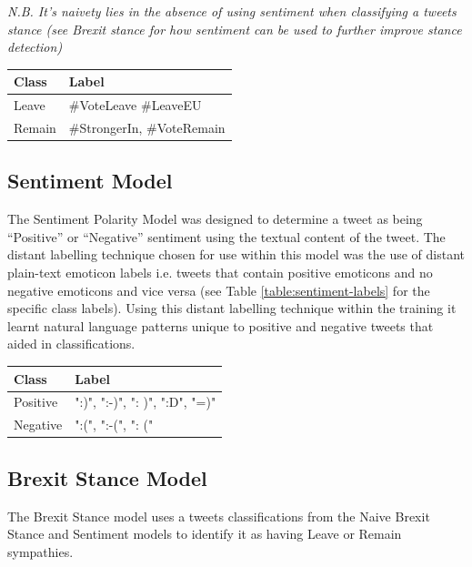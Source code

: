 \documentclass[11pt]{report}
\begin{document}
\textit{N.B. It's naivety lies in the absence of using sentiment when classifying a tweets stance
(see Brexit stance for how sentiment can be used to further improve stance detection)}

\clearpage

\begin{center}
\begin{tabular}{ |p{1.5cm}||p{5cm}| }
\hline
 Class & Label\\
 \hline
 Leave &  \#VoteLeave \#LeaveEU\\
 \hline
 Remain &  \#StrongerIn, \#VoteRemain\\
 \hline
\end{tabular}
\label{table:naive-labels}
\end{center}

\subsection{Sentiment Model}
The Sentiment Polarity Model was designed to determine a tweet as being ``Positive'' or
``Negative'' sentiment using the textual content of the tweet. The distant labelling technique
chosen for use within this model was the use of distant plain-text emoticon labels i.e. tweets
that contain positive emoticons and no negative emoticons and vice versa (see Table  \ref{table:sentiment-labels} for the specific class labels). Using this distant labelling technique within the training it learnt natural language patterns unique to positive
and negative tweets that aided in classifications.

\begin{center}
\begin{tabular}{ |p{1.5cm}||p{5cm}| }
\hline
 Class & Label\\
 \hline
 Positive & ":)", ":-)", ": )", ":D", "=)"\\
 \hline
 Negative &  ":(", ":-(", ": ("\\
 \hline
\end{tabular}
\label{table:sentiment-labels}
\end{center}

\subsection{Brexit Stance Model}
The Brexit Stance model uses a tweets classifications from the Naive Brexit Stance and
Sentiment models to identify it as having Leave or Remain sympathies.
\\
\end{document}
